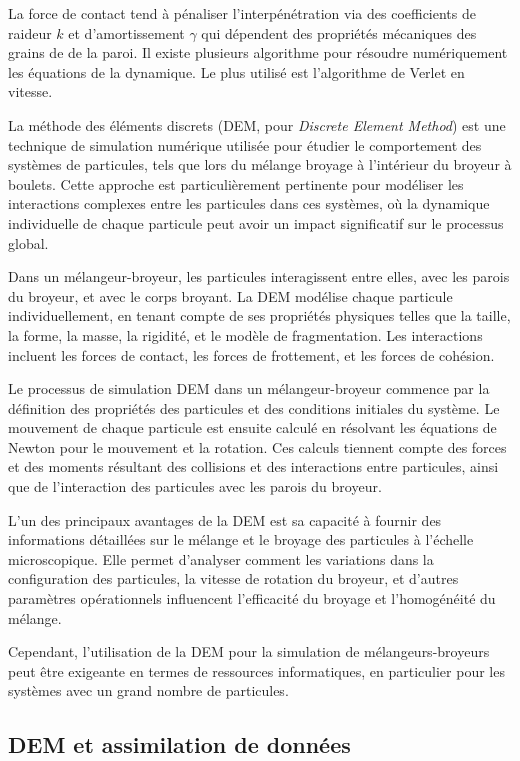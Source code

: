 La force de contact tend à pénaliser l'interpénétration via des coefficients de raideur $k$ et d'amortissement $\gamma$ qui dépendent des propriétés mécaniques des grains de de la paroi. Il existe plusieurs algorithme pour résoudre numériquement les équations de la dynamique. Le plus utilisé est l'algorithme de Verlet en vitesse.


La méthode des éléments discrets (DEM, pour \textit{Discrete Element Method}) est une technique de simulation numérique utilisée pour étudier le comportement des systèmes de particules, tels que lors du mélange broyage à l'intérieur du broyeur à boulets. Cette approche est particulièrement pertinente pour modéliser les interactions complexes entre les particules dans ces systèmes, où la dynamique individuelle de chaque particule peut avoir un impact significatif sur le processus global.

Dans un mélangeur-broyeur, les particules interagissent entre elles, avec les parois du broyeur, et avec le corps broyant. La DEM modélise chaque particule individuellement, en tenant compte de ses propriétés physiques telles que la taille, la forme, la masse, la rigidité, et le modèle de fragmentation. Les interactions incluent les forces de contact, les forces de frottement, et les forces de cohésion.

Le processus de simulation DEM dans un mélangeur-broyeur commence par la définition des propriétés des particules et des conditions initiales du système. Le mouvement de chaque particule est ensuite calculé en résolvant les équations de Newton pour le mouvement et la rotation. Ces calculs tiennent compte des forces et des moments résultant des collisions et des interactions entre particules, ainsi que de l'interaction des particules avec les parois du broyeur.

L'un des principaux avantages de la DEM est sa capacité à fournir des informations détaillées sur le mélange et le broyage des particules à l'échelle microscopique. Elle permet d'analyser comment les variations dans la configuration des particules, la vitesse de rotation du broyeur, et d'autres paramètres opérationnels influencent l'efficacité du broyage et l'homogénéité du mélange.

Cependant, l'utilisation de la DEM pour la simulation de mélangeurs-broyeurs peut être exigeante en termes de ressources informatiques, en particulier pour les systèmes avec un grand nombre de particules.

\subsection{DEM et assimilation de données}

